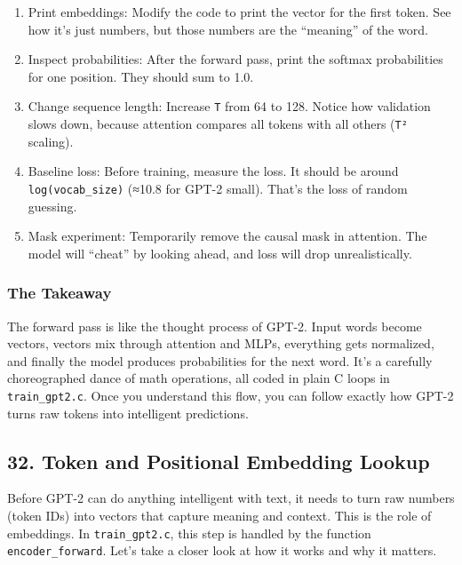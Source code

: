 \documentclass[
  letterpaper,
  DIV=11,
  numbers=noendperiod]{scrreprt}
\providecommand{\tightlist}{%
  \setlength{\itemsep}{0pt}\setlength{\parskip}{0pt}}
\begin{document}
\begin{enumerate}
\def\labelenumi{\arabic{enumi}.}
\tightlist
\item
  Print embeddings: Modify the code to print the vector for the first
  token. See how it's just numbers, but those numbers are the
  ``meaning'' of the word.
\item
  Inspect probabilities: After the forward pass, print the softmax
  probabilities for one position. They should sum to 1.0.
\item
  Change sequence length: Increase \texttt{T} from 64 to 128. Notice how
  validation slows down, because attention compares all tokens with all
  others (\texttt{T²} scaling).
\item
  Baseline loss: Before training, measure the loss. It should be around
  \texttt{log(vocab\_size)} (≈10.8 for GPT-2 small). That's the loss of
  random guessing.
\item
  Mask experiment: Temporarily remove the causal mask in attention. The
  model will ``cheat'' by looking ahead, and loss will drop
  unrealistically.
\end{enumerate}

\subsubsection{The Takeaway}\label{the-takeaway-20}

The forward pass is like the thought process of GPT-2. Input words
become vectors, vectors mix through attention and MLPs, everything gets
normalized, and finally the model produces probabilities for the next
word. It's a carefully choreographed dance of math operations, all coded
in plain C loops in \texttt{train\_gpt2.c}. Once you understand this
flow, you can follow exactly how GPT-2 turns raw tokens into intelligent
predictions.

\subsection{32. Token and Positional Embedding
Lookup}\label{token-and-positional-embedding-lookup}

Before GPT-2 can do anything intelligent with text, it needs to turn raw
numbers (token IDs) into vectors that capture meaning and context. This
is the role of embeddings. In \texttt{train\_gpt2.c}, this step is
handled by the function \texttt{encoder\_forward}. Let's take a closer
look at how it works and why it matters.
\end{document}
